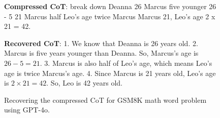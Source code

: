 \begin{figure}[htbp]
\begin{tcolorbox}[colback=blue!5!white,colframe=blue!75!black,title=Revovering the Compressed Chain-of-Thought,fontupper=\footnotesize,fonttitle=\scriptsize]
\textbf{Compressed CoT}: break down Deanna 26 Marcus five younger 26 - 5 21 Marcus half Leo's age twice Marcus Marcus 21, Leo's age 2 x 21 = 42.

\vskip 0.1in
        
\textbf{Recovered CoT}: 1. We know that Deanna is 26 years old. 2. Marcus is five years younger than Deanna. So, Marcus’s age is \( 26 - 5 = 21 \). 3. Marcus is also half of Leo’s age, which means Leo’s age is twice Marcus’s age. 4. Since Marcus is 21 years old, Leo’s age is \( 2 \times 21 = 42 \). So, Leo is 42 years old.
\end{tcolorbox}
\vskip -0.1in
\caption{Recovering the compressed CoT for GSM8K math word problem using GPT-4o.}
\vskip -0.1in
\label{fig:recovery-gpt}
\end{figure}